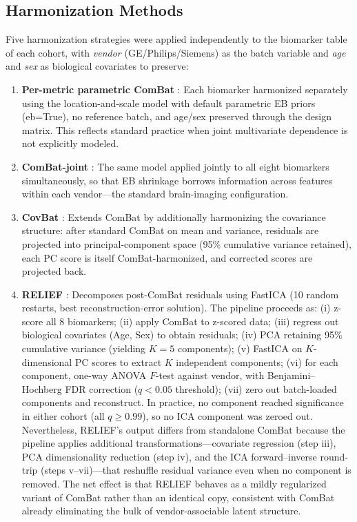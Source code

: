\documentclass[12pt,a4paper]{article}
\begin{document}
\subsection{Harmonization Methods}

Five harmonization strategies were applied independently to the biomarker table of each cohort, with \emph{vendor} (GE/Philips/Siemens) as the batch variable and \emph{age} and \emph{sex} as biological covariates to preserve:

\begin{enumerate}[nosep]
  \item \textbf{Per-metric parametric ComBat} \cite{johnson2007adjusting,fortin2017harmonization}: Each biomarker harmonized separately using the location-and-scale model with default parametric EB priors (eb=True), no reference batch, and age/sex preserved through the design matrix. This reflects standard practice when joint multivariate dependence is not explicitly modeled.
  \item \textbf{ComBat-joint} \cite{fortin2017harmonization}: The same model applied jointly to all eight biomarkers simultaneously, so that EB shrinkage borrows information across features within each vendor---the standard brain-imaging configuration.
  \item \textbf{CovBat} \cite{chen2022mitigating}: Extends ComBat by additionally harmonizing the covariance structure: after standard ComBat on mean and variance, residuals are projected into principal-component space (95\% cumulative variance retained), each PC score is itself ComBat-harmonized, and corrected scores are projected back.
  \item \textbf{RELIEF} \cite{zhang2023relief}: Decomposes post-ComBat residuals using FastICA (10 random restarts, best reconstruction-error solution). The pipeline proceeds as: (i) z-score all 8 biomarkers; (ii) apply ComBat to z-scored data; (iii) regress out biological covariates (Age, Sex) to obtain residuals; (iv) PCA retaining 95\% cumulative variance (yielding $K=5$ components); (v) FastICA on $K$-dimensional PC scores to extract $K$ independent components; (vi) for each component, one-way ANOVA $F$-test against vendor, with Benjamini--Hochberg FDR correction ($q < 0.05$ threshold); (vii) zero out batch-loaded components and reconstruct. In practice, no component reached significance in either cohort (all $q \geq 0.99$), so no ICA component was zeroed out. Nevertheless, RELIEF's output differs from standalone ComBat because the pipeline applies additional transformations---covariate regression (step iii), PCA dimensionality reduction (step iv), and the ICA forward--inverse round-trip (steps v--vii)---that reshuffle residual variance even when no component is removed. The net effect is that RELIEF behaves as a mildly regularized variant of ComBat rather than an identical copy, consistent with ComBat already eliminating the bulk of vendor-associable latent structure.

\end{enumerate}
\end{document}
